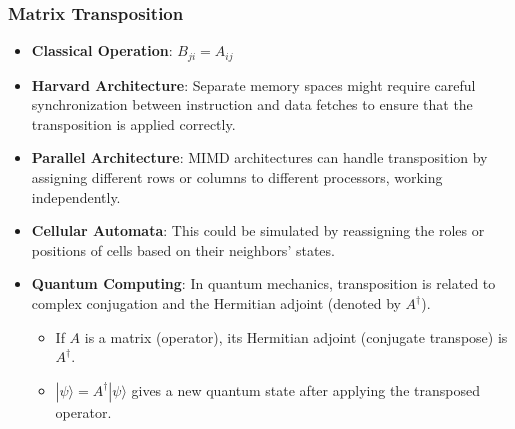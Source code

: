 \documentclass{article}
\begin{document}
\subsubsection{Matrix Transposition}
\begin{itemize}
    \item \textbf{Classical Operation}: \( B_{ji} = A_{ij} \)
    \item \textbf{Harvard Architecture}: Separate memory spaces might require careful synchronization between instruction and data fetches to ensure that the transposition is applied correctly.
    \item \textbf{Parallel Architecture}: MIMD architectures can handle transposition by assigning different rows or columns to different processors, working independently.
    \item \textbf{Cellular Automata}: This could be simulated by reassigning the roles or positions of cells based on their neighbors’ states.
    \item \textbf{Quantum Computing}: In quantum mechanics, transposition is related to complex conjugation and the Hermitian adjoint (denoted by \( A^\dagger \)). 
    \begin{itemize}
        \item If \( A \) is a matrix (operator), its Hermitian adjoint (conjugate transpose) is \( A^\dagger \). 
        \item \( |\psi\rangle = A^\dagger|\psi\rangle \) gives a new quantum state after applying the transposed operator.
    \end{itemize}
\end{itemize}
\end{document}
